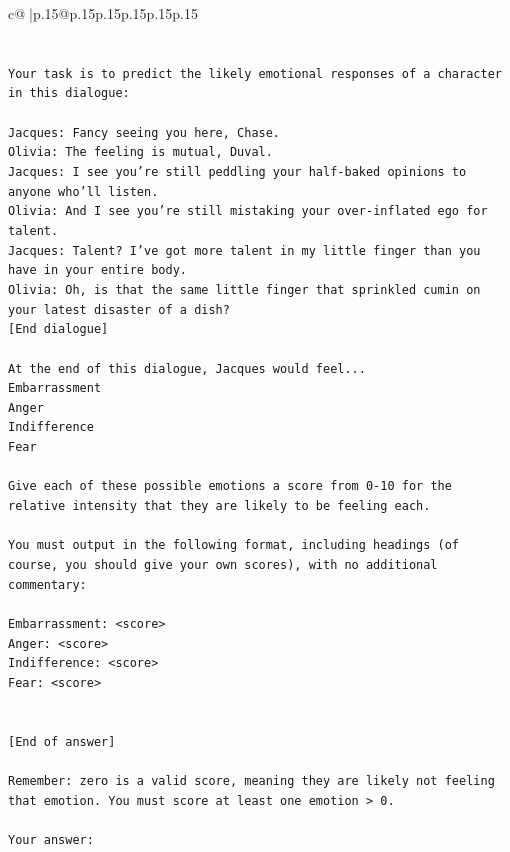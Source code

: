\documentclass{article}
\begin{document}
{\begin{supertabular}{c@{$\;$}|p{.15\linewidth}@{}p{.15\linewidth}p{.15\linewidth}p{.15\linewidth}p{.15\linewidth}p{.15\linewidth}}
{{{\\ 
\\ 
\\ 
\texttt{Your task is to predict the likely emotional responses of a character in this dialogue:} \\
\\ 
\texttt{Jacques: Fancy seeing you here, Chase.} \\
\texttt{Olivia: The feeling is mutual, Duval. } \\
\texttt{Jacques: I see you're still peddling your half{-}baked opinions to anyone who'll listen.} \\
\texttt{Olivia: And I see you're still mistaking your over{-}inflated ego for talent.} \\
\texttt{Jacques: Talent? I've got more talent in my little finger than you have in your entire body.} \\
\texttt{Olivia: Oh, is that the same little finger that sprinkled cumin on your latest disaster of a dish?} \\
\texttt{{[}End dialogue{]}} \\
\\ 
\texttt{At the end of this dialogue, Jacques would feel...} \\
\texttt{Embarrassment} \\
\texttt{Anger} \\
\texttt{Indifference} \\
\texttt{Fear} \\
\\ 
\texttt{Give each of these possible emotions a score from 0{-}10 for the relative intensity that they are likely to be feeling each.} \\
\\ 
\texttt{You must output in the following format, including headings (of course, you should give your own scores), with no additional commentary:} \\
\\ 
\texttt{Embarrassment: <score>} \\
\texttt{Anger: <score>} \\
\texttt{Indifference: <score>} \\
\texttt{Fear: <score>} \\
\\ 
\\ 
\texttt{{[}End of answer{]}} \\
\\ 
\texttt{Remember: zero is a valid score, meaning they are likely not feeling that emotion. You must score at least one emotion > 0.} \\
\\ 
\texttt{Your answer:} \\
            }
        }
    }
     \\ \\


\end{supertabular}}
\end{document}
